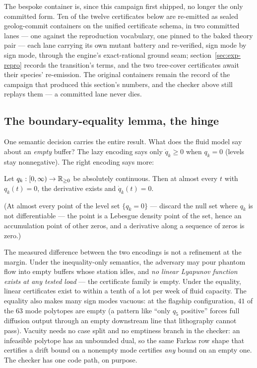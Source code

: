 The bespoke container is, since this campaign first shipped, no
longer the only committed form. Ten of the twelve certificates below
are re-emitted as sealed geolog-commit containers on the unified
certificate schema, in two committed lanes --- one against the
reproduction vocabulary, one pinned to the baked theory pair ---
each lane carrying its own mutant battery and re-verified, sign mode
by sign mode, through the engine's exact-rational ground seam;
section~\ref{sec:exp-repro} records the transition's terms, and the
two tree-cover certificates await their species' re-emission. The
original containers remain the record of the campaign that produced
this section's numbers, and the checker above still replays them ---
a committed lane never dies.

\subsection{The boundary-equality lemma, the hinge}

One semantic decision carries the entire result. What does the fluid
model say about an \emph{empty} buffer? The lazy encoding says only
$\dot q_k \ge 0$ when $q_k = 0$ (levels stay nonnegative). The right
encoding says more:

\begin{lemma}
\label{lem:minifab-boundary}
Let $q_k : [0,\infty) \to \mathbb{R}_{\ge 0}$ be absolutely continuous. Then
at almost every $t$ with $q_k(t) = 0$, the derivative exists and
$\dot q_k(t) = 0$.
\end{lemma}

\noindent (At almost every point of the level set $\{q_k = 0\}$ ---
discard the null set where $q_k$ is not differentiable --- the point
is a Lebesgue density point of the set, hence an accumulation point
of other zeros, and a derivative along a sequence of zeros is zero.)

The measured difference between the two encodings is not a
refinement at the margin. Under the inequality-only semantics, the
adversary may pour phantom flow into empty buffers whose station
idles, and \emph{no linear Lyapunov function exists at any tested
load} --- the certificate family is empty. Under the equality, linear
certificates exist to within a tenth of a lot per week of fluid
capacity. The
equality also makes many sign modes vacuous: at the flagship
configuration, $41$ of the $63$ mode polytopes are empty (a pattern
like ``only $q_5$ positive'' forces full diffusion output through an
empty downstream line that lithography cannot pass). Vacuity needs no
case split and no emptiness branch in the checker: an infeasible
polytope has an unbounded dual, so the same Farkas row shape that
certifies a drift bound on a nonempty mode certifies \emph{any} bound
on an empty one. The checker has one code path, on purpose.


